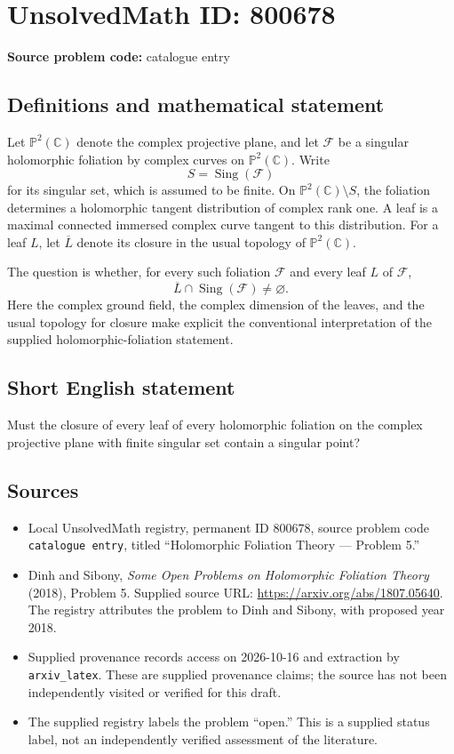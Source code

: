 \documentclass[11pt]{article}
\newcommand{\C}{\mathbb{C}}
\newcommand{\PP}{\mathbb{P}}
\begin{document}
\section*{UnsolvedMath ID: 800678}
\textbf{Source problem code:} catalogue entry
\subsection{Definitions and mathematical statement}
Let \(\PP^2(\C)\) denote the complex projective plane, and let \(\mathscr F\) be a singular holomorphic foliation by complex curves on \(\PP^2(\C)\). Write
\[
S=\operatorname{Sing}(\mathscr F)
\]
for its singular set, which is assumed to be finite. On \(\PP^2(\C)\setminus S\), the foliation determines a holomorphic tangent distribution of complex rank one. A leaf is a maximal connected immersed complex curve tangent to this distribution. For a leaf \(L\), let \(\overline L\) denote its closure in the usual topology of \(\PP^2(\C)\).

The question is whether, for every such foliation \(\mathscr F\) and every leaf \(L\) of \(\mathscr F\),
\[
\overline L\cap\operatorname{Sing}(\mathscr F)\ne\varnothing.
\]
Here the complex ground field, the complex dimension of the leaves, and the usual topology for closure make explicit the conventional interpretation of the supplied holomorphic-foliation statement.
\subsection{Short English statement}
Must the closure of every leaf of every holomorphic foliation on the complex projective plane with finite singular set contain a singular point?
\subsection{Sources}
\begin{itemize}
\item Local UnsolvedMath registry, permanent ID \(800678\), source problem code \texttt{catalogue entry}, titled ``Holomorphic Foliation Theory --- Problem 5.''
\item Dinh and Sibony, \emph{Some Open Problems on Holomorphic Foliation Theory} (2018), Problem 5. Supplied source URL: \url{https://arxiv.org/abs/1807.05640}. The registry attributes the problem to Dinh and Sibony, with proposed year 2018.
\item Supplied provenance records access on 2026-10-16 and extraction by \texttt{arxiv\_latex}. These are supplied provenance claims; the source has not been independently visited or verified for this draft.
\item The supplied registry labels the problem ``open.'' This is a supplied status label, not an independently verified assessment of the literature.
\end{itemize}
\end{document}
